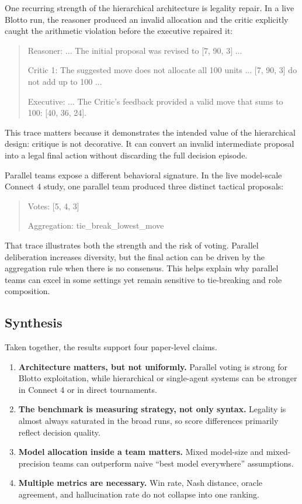 \documentclass[11pt]{article}
\newenvironment{traceblock}{\begin{quote}\small\ttfamily\color{black!85}}{\end{quote}}
\begin{document}
One recurring strength of the hierarchical architecture is legality repair. In a live Blotto run, the reasoner produced an invalid allocation and the critic explicitly caught the arithmetic violation before the executive repaired it:

\begin{traceblock}
Reasoner: ... The initial proposal was revised to [7, 90, 3] ...

Critic 1: The suggested move does not allocate all 100 units ... [7, 90, 3] do not add up to 100 ...

Executive: ... The Critic's feedback provided a valid move that sums to 100: [40, 36, 24].
\end{traceblock}

This trace matters because it demonstrates the intended value of the hierarchical design: critique is not decorative. It can convert an invalid intermediate proposal into a legal final action without discarding the full decision episode.

Parallel teams expose a different behavioral signature. In the live model-scale Connect 4 study, one parallel team produced three distinct tactical proposals:

\begin{traceblock}
Votes: [5, 4, 3]

Aggregation: tie\_break\_lowest\_move
\end{traceblock}

That trace illustrates both the strength and the risk of voting. Parallel deliberation increases diversity, but the final action can be driven by the aggregation rule when there is no consensus. This helps explain why parallel teams can excel in some settings yet remain sensitive to tie-breaking and role composition.

\subsection{Synthesis}
Taken together, the results support four paper-level claims.
\begin{enumerate}[leftmargin=1.4em]
  \item \textbf{Architecture matters, but not uniformly.} Parallel voting is strong for Blotto exploitation, while hierarchical or single-agent systems can be stronger in Connect 4 or in direct tournaments.
  \item \textbf{The benchmark is measuring strategy, not only syntax.} Legality is almost always saturated in the broad runs, so score differences primarily reflect decision quality.
  \item \textbf{Model allocation inside a team matters.} Mixed model-size and mixed-precision teams can outperform naive ``best model everywhere'' assumptions.
  \item \textbf{Multiple metrics are necessary.} Win rate, Nash distance, oracle agreement, and hallucination rate do not collapse into one ranking.
\end{enumerate}
\end{document}
